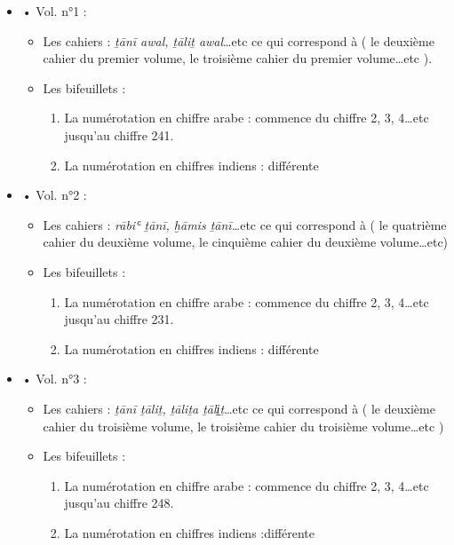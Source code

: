 \documentclass[a4paper,12pt]{report}
\begin{document}
\begin{itemize}
\begin{enumerate}
\begin{itemize}
\end{itemize}
\newpage
\begin{itemize}
    \item •	Vol. n°1 : 
    \begin{itemize}
        \item 	Les cahiers : \textit{ṯānī awal, ṯāliṯ awal}…etc ce qui correspond à ( le deuxième cahier du premier volume, le troisième cahier du premier volume…etc ). 
        \item Les bifeuillets : 
        \begin{enumerate}
            \item La numérotation en chiffre arabe : commence du chiffre 2, 3, 4…etc jusqu’au chiffre  241. 
            \item La numérotation en chiffres indiens : différente
              
          
     
        \end{enumerate}
    
     
        
    \end{itemize}
    \item •	Vol. n°2 : 
    \begin{itemize}
        \item 	Les cahiers : \textit{rābiʿ ṯānī, ḫāmis ṯānī…}etc ce qui correspond à (  le quatrième cahier du deuxième volume, le cinquième cahier du deuxième volume…etc) 
        \item Les bifeuillets : 
         \begin{enumerate}
            \item La numérotation en chiffre arabe :  commence du chiffre 2, 3, 4…etc jusqu’au chiffre  231. 
            \item La numérotation en chiffres indiens : différente
              
         
     
        \end{enumerate}
    
    \end{itemize}
    \item •	Vol. n°3 : 
    \begin{itemize}
        \item 	Les cahiers : \textit{ṯānī ṯāliṯ, ṯāliṯa ṯāli̠ṯ}…etc ce qui correspond à (  le deuxième cahier du troisième volume, le troisième cahier du troisième volume…etc ) 
        \item Les bifeuillets : 
         \begin{enumerate}
            \item La numérotation en chiffre arabe :  commence du chiffre 2, 3, 4…etc jusqu’au chiffre  248. 
            \item La numérotation en chiffres indiens :différente




\end{enumerate}
\end{itemize}
\end{itemize}
\end{enumerate}
\end{itemize}
\end{document}
